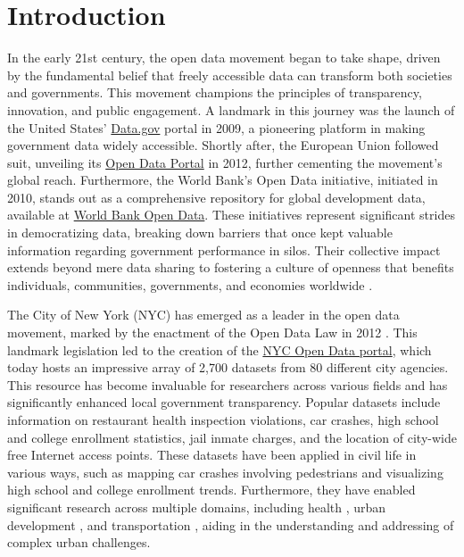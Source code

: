 \documentclass[linenumber]{jdsart}
\begin{document}
\section{Introduction} 
\label{sec:intro}

In the early 21st century, the open data movement began 
to take shape, driven by the fundamental belief that 
freely accessible data can transform both societies and 
governments. This movement champions the principles
of transparency, innovation, and public engagement. 
A landmark in this journey was the launch of the United States'
\href{https://www.data.gov}{Data.gov} portal in 2009, a pioneering
platform in making government data widely accessible. Shortly after,
the European Union followed suit, unveiling its
\href{https://data.europa.eu/euodp}{Open Data Portal} in 2012, further
cementing the movement's global reach. Furthermore, the World Bank's Open
Data initiative, initiated in 2010, stands out as a comprehensive
repository for global development data, available at
\href{https://data.worldbank.org}{World Bank Open Data}. 
These initiatives represent significant strides in democratizing data, 
breaking down barriers that once kept valuable information 
regarding government performance in silos. Their collective impact 
extends beyond mere data sharing to fostering a culture of openness 
that benefits individuals, communities, governments, and economies worldwide 
\citep{barns2016mine, wang2016adoption}.


The City of New York (NYC) has emerged as a leader in the open data movement,
marked by the enactment of the Open Data Law in 2012
\citep{zuiderwijk2014open}. This landmark legislation led to the
creation of the \href{https://opendata.cityofnewyork.us}{NYC Open Data
  portal}, which today hosts an impressive array of 2,700 datasets
from 80 different city agencies. This resource has become invaluable
for researchers across various fields and has significantly enhanced
local government transparency. Popular datasets include information on
restaurant health inspection violations, car crashes, high school and
college enrollment statistics, jail inmate charges, and the location
of city-wide free Internet access points. These datasets have been
applied in civil life in various ways, such as mapping car crashes
involving pedestrians and visualizing high school and college
enrollment trends. Furthermore, they have enabled significant research
across multiple domains, including health \citep{cantor2018facets,
  shankar2021data}, urban development \citep{neves2020impacts}, and
transportation \citep{gerte2019understanding}, aiding in the
understanding and addressing of complex urban challenges.
\end{document}
